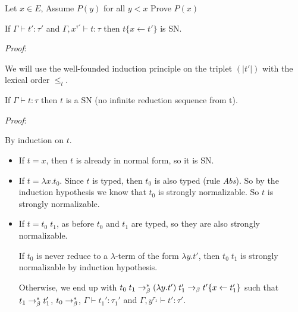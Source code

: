   Let $x \in E$, Assume $P(y)$ for all $y < x$ Prove $P(x)$

  \lemma
  If $\Gamma \vdash t' : \tau'$ and $\Gamma, x^{\tau'} \vdash t : \tau$ then $t\{x
  \leftarrow t'\}$ is SN.

  \textit{Proof}:
  
  We will use the well-founded induction principle on the triplet $(|t'|)$ with the
  lexical order $\leq_l$.

  \qedsymbol

  \lemma
  If $\Gamma \vdash t : \tau$ then $t$ is a SN (no infinite reduction sequence
  from t).

  \textit{Proof}:

  By induction on $t$.

  \begin{itemize}
    \item If $t = x$, then $t$ is already in normal form, so it is SN.

    \item If $t = \lambda x. t_0$. Since $t$ is typed, then $t_0$ is also typed
      (rule \textit{Abs}). So by the induction hypothesis we know that $t_0$ is
      strongly normalizable. So $t$ is strongly normalizable.

    \item If $t = t_0\; t_1$, as before $t_0$ and $t_1$ are typed, so they are
      also strongly normalizable.

      If $t_0$ is never reduce to a $\lambda$-term of the form $\lambda y. t'$,
      then $t_0\;t_1$ is strongly normalizable by induction hypothesis.

      Otherwise, we end up with $t_0\;t_1 \to_\beta^* (\lambda y.t')\;t_1' \to_\beta
      t'\{x \leftarrow t_1'\}$ such
      that $t_1 \to_\beta^* t_1'$, $t_0 \to_\beta^*$, $\Gamma \vdash t_1' : \tau_1'$ and
      $\Gamma, y^{\tau_1} \vdash t' : \tau'$.
  \end{itemize}


  \qedsymbol



